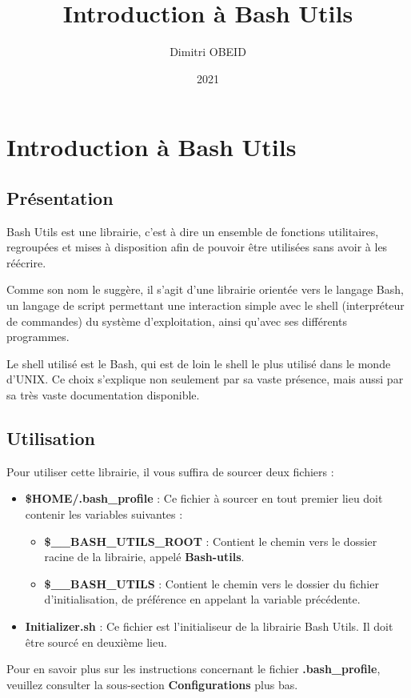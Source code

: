 \documentclass[a4paper,10pt]{article}
\title{\color{red}Introduction à Bash Utils}\color{white}
\author{Dimitri OBEID}
\date{2021}
\begin{document}
\maketitle
\newpage

\tableofcontents
\newpage

\color{red}
\section{Introduction à Bash Utils}\color{white}

\color{green}
\subsection{Présentation}\color{white}
Bash Utils est une librairie, c'est à dire un ensemble de fonctions utilitaires, regroupées et mises à disposition afin de pouvoir être utilisées sans avoir à les réécrire.\linebreak

Comme son nom le suggère, il s'agit d'une librairie orientée vers le langage Bash, un langage de script permettant une interaction simple avec le shell (interpréteur de commandes) du système d'exploitation, ainsi qu'avec ses différents programmes.\linebreak

Le shell utilisé est le Bash, qui est de loin le shell le plus utilisé dans le monde d'UNIX. Ce choix s'explique non seulement par sa vaste présence, mais aussi par sa très vaste documentation disponible.

\color{green}
\subsection{Utilisation}\color{white}
Pour utiliser cette librairie, il vous suffira de sourcer deux fichiers :
\begin{itemize}
    \item \color{orange}\textbf{\$HOME\color{lime}/.bash\_profile}\color{white} : Ce fichier à sourcer en tout premier lieu doit contenir les variables suivantes :
    \begin{itemize}
        \item \color{orange}\textbf{\$\_\_BASH\_UTILS\_ROOT}\color{white} : Contient le chemin vers le dossier racine de la librairie, appelé \color{lime}\textbf{Bash-utils}\color{white}.
        \item \color{orange}\textbf{\$\_\_BASH\_UTILS}\color{white} : Contient le chemin vers le dossier du fichier d'initialisation, de préférence en appelant la variable précédente.\linebreak
    \end{itemize}

    \item \color{lime}\textbf{Initializer.sh}\color{white} : Ce fichier est l'initialiseur de la librairie Bash Utils. Il doit être sourcé en deuxième lieu.

\end{itemize}
	Pour en savoir plus sur les instructions concernant le fichier \color{lime}\textbf{.bash\_profile}\color{white}, veuillez consulter la sous-section \textbf{Configurations} plus bas.
\end{document}
